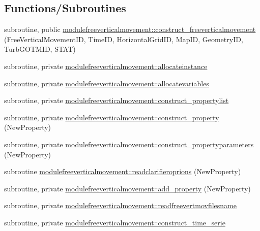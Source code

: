 \subsection*{Functions/\+Subroutines}
\begin{DoxyCompactItemize}
\item 
subroutine, public \mbox{\hyperlink{namespacemodulefreeverticalmovement_a3b98553e1845617e703a449e92c798c9}{modulefreeverticalmovement\+::construct\+\_\+freeverticalmovement}} (Free\+Vertical\+Movement\+ID, Time\+ID, Horizontal\+Grid\+ID, Map\+ID, Geometry\+ID, Turb\+G\+O\+T\+M\+ID, S\+T\+AT)
\item 
subroutine, private \mbox{\hyperlink{namespacemodulefreeverticalmovement_a07f25d7228ee74ef7003eea9ba19e494}{modulefreeverticalmovement\+::allocateinstance}}
\item 
subroutine, private \mbox{\hyperlink{namespacemodulefreeverticalmovement_a7ec18a4b674d7b9ea1339f2a93116e0a}{modulefreeverticalmovement\+::allocatevariables}}
\item 
subroutine, private \mbox{\hyperlink{namespacemodulefreeverticalmovement_a5ca7e73e0a11ea273e8a65cdd0734e44}{modulefreeverticalmovement\+::construct\+\_\+propertylist}}
\item 
subroutine, private \mbox{\hyperlink{namespacemodulefreeverticalmovement_af393a68b806664c9eea39ca1dec93cf9}{modulefreeverticalmovement\+::construct\+\_\+property}} (New\+Property)
\item 
subroutine, private \mbox{\hyperlink{namespacemodulefreeverticalmovement_a5899cd9d999076fff990bfecf3b374a7}{modulefreeverticalmovement\+::construct\+\_\+propertyparameters}} (New\+Property)
\item 
subroutine \mbox{\hyperlink{namespacemodulefreeverticalmovement_a2b10bad3ef2fbac72aed08e6bf29bcd6}{modulefreeverticalmovement\+::readclarifieroprions}} (New\+Property)
\item 
subroutine, private \mbox{\hyperlink{namespacemodulefreeverticalmovement_a9138567f31f0c9e91b69d5268c3855ce}{modulefreeverticalmovement\+::add\+\_\+property}} (New\+Property)
\item 
subroutine, private \mbox{\hyperlink{namespacemodulefreeverticalmovement_adb8368e5dfca81f3d1a6bd7881e19c7f}{modulefreeverticalmovement\+::readfreevertmovfilesname}}
\item 
subroutine, private \mbox{\hyperlink{namespacemodulefreeverticalmovement_a2ca295c9f72cbcb4ce9b0d893235eca0}{modulefreeverticalmovement\+::construct\+\_\+time\+\_\+serie}}
\item 

\end{DoxyCompactItemize}
